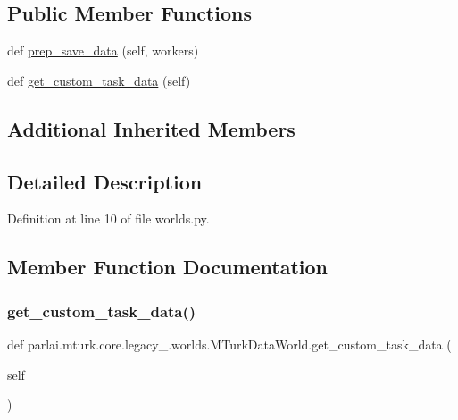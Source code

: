 \subsection*{Public Member Functions}
\begin{DoxyCompactItemize}
\item 
def \hyperlink{classparlai_1_1mturk_1_1core_1_1legacy__2018_1_1worlds_1_1MTurkDataWorld_ab0fd2eeab0ed799e565c5e97694cd135}{prep\+\_\+save\+\_\+data} (self, workers)
\item 
def \hyperlink{classparlai_1_1mturk_1_1core_1_1legacy__2018_1_1worlds_1_1MTurkDataWorld_a834f25dbb19035fa683d78980e9493c4}{get\+\_\+custom\+\_\+task\+\_\+data} (self)
\end{DoxyCompactItemize}
\subsection*{Additional Inherited Members}


\subsection{Detailed Description}


Definition at line 10 of file worlds.\+py.



\subsection{Member Function Documentation}
\mbox{\label{classparlai_1_1mturk_1_1core_1_1legacy__2018_1_1worlds_1_1MTurkDataWorld_a834f25dbb19035fa683d78980e9493c4}} 
\subsubsection{\texorpdfstring{get\+\_\+custom\+\_\+task\+\_\+data()}{get\_custom\_task\_data()}}
{\footnotesize\ttfamily def parlai.\+mturk.\+core.\+legacy\+\_.\+worlds.\+M\+Turk\+Data\+World.\+get\+\_\+custom\+\_\+task\+\_\+data (\begin{DoxyParamCaption}\item[{}]{self }\end{DoxyParamCaption})}

